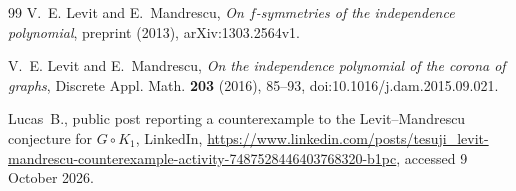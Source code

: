 \documentclass[11pt]{amsart}
\theoremstyle{remark}
\numberwithin{equation}{section}
\newcommand{\cor}{\circ}
\begin{document}
\begin{thebibliography}{99}
V.~E. Levit and E.~Mandrescu, \emph{On $f$-symmetries of the independence polynomial}, preprint (2013), arXiv:1303.2564v1.

V.~E. Levit and E.~Mandrescu, \emph{On the independence polynomial of the corona of graphs}, Discrete Appl. Math. \textbf{203} (2016), 85--93, doi:10.1016/j.dam.2015.09.021.

{\sloppy Lucas~B., public post reporting a counterexample to the Levit--Mandrescu conjecture for $G\cor K_1$, LinkedIn, \url{https://www.linkedin.com/posts/tesuji_levit-mandrescu-counterexample-activity-7487528446403768320-b1pc}, accessed 9 October 2026.\par}

\end{thebibliography}
\end{document}
